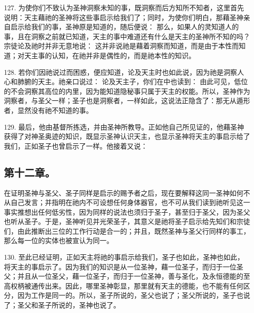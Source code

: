 127. 为使你们不致认为圣神洞察未知的事，既洞察而后方知所不知者，这里首先说明：天主藉祂的圣神将这些事启示给我们了；同时，为使你们明白，那藉圣神亲自启示给我们的事，圣神原是知道的，随后便说： 那么，如果人的灵知道人的事，且在洞察之前就已知道，天主的事中难道还有什么是天主的圣神所不知的吗？宗徒论及祂时并非无意地说： 这并非说祂是藉着洞察而知道，而是由于本性而知道；对天主事的认知，在祂并非是偶性的，而是祂本性的知识。\par

128. 若你们因祂说过而困惑，便应知道，论及天主时也如此说，因为祂是洞察人心和肺腑的天主。祂亲口说过： 论及天主子，你们在中也读到： 由此可见，低位的不会洞察其高位的内里，因为能知道隐秘事只属于天主的权能。所以，圣神作为洞察者，与圣父一样；圣子也是洞察者，一样如此，这说法正隐含了：那无从遁形者，显然没有祂不知道的事。\par

129. 最后，他由基督所拣选，并由圣神所教导。正如他自己所见证的，他藉圣神获得了对神圣奥迹的知识，既显示圣神认识天主，也显示圣神将天主的事启示给了我们，正如圣子也曾启示了一样。他接着又说：\par


\subsection{第十二章。}

在证明圣神与圣父、圣子同样是启示的赐予者之后，现在要解释这同一圣神如何不从自己发言；并指明在祂内不可设想任何身体器官，也不可从我们读到祂听见这一事实推想出任何低劣性，因为同样的说法也须归于圣子，甚至归于圣父，因为圣父也听从圣子。于是，圣神听见并光荣圣子，其意义是祂将圣子启示给先知们和宗徒们，由此推断出三位的工作行动是合一的；并且，既然圣神与圣父行同样的事工，那么每一位的实体也被宣认为同一。\par

130. 至此已经证明，正如天主将祂的事启示给我们，圣子也如此，圣神也如此，将天主的事启示了。因为我们的知识是从一位圣神，藉一位圣子，而归于一位圣父；并且从一位圣父，藉一位圣子，而归于一位圣神，善与圣化，及永恒德能的至高权柄被通传出来。因此，哪里圣神彰显，那里就有天主的德能，也不能有任何区分，因为工作是同一的。所以，圣子所说的，圣父也说了；圣父所说的，圣子也说了；圣父和圣子所说的，圣神也说了。\par

